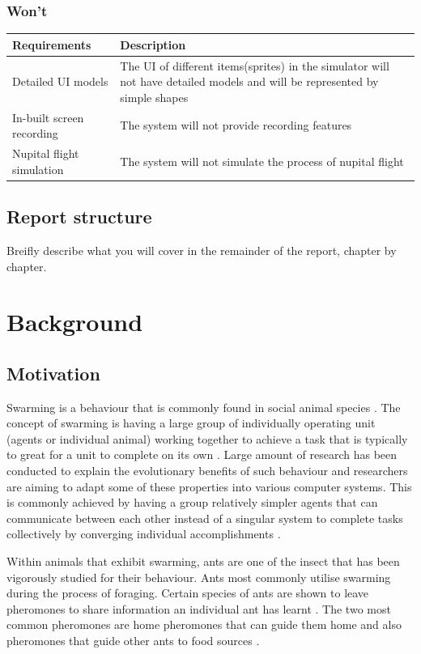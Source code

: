 \documentclass[a4paper, oneside, 11pt]{report}
\begin{document}
\subsection{Won't}
\begin{tabular}{|| p{3.5cm} | p{10.5cm} ||} 
	\hline
	Requirements & Description \\
	\hline
	Detailed UI models &  The UI of different items(sprites) in the simulator will not have detailed models and will be represented by simple shapes\\
	\hline
	In-built screen recording & The system will not provide recording features \\
	\hline
	Nupital flight simulation & The system will not simulate the process of nupital flight \\
	\hline
\end{tabular}

\section{Report structure}
Breifly describe what you will cover in the remainder of the report, chapter by chapter.

\chapter{Background}
\section{Motivation}
Swarming is a behaviour that is commonly found in social animal species \citep{Swarm_Animals}. The concept of swarming is having a large group of individually operating unit (agents or individual animal) working together to achieve a task that is typically to great for a unit to complete on its own \citep{Swarm_Explanation}. Large amount of research has been conducted to explain the evolutionary benefits of such behaviour and researchers are aiming to adapt some of these properties into various computer systems. This is commonly achieved by having a group relatively simpler agents that can communicate between each other instead of a singular system to complete tasks collectively by converging individual accomplishments \citep{Swarm_Properties}.

Within animals that exhibit swarming, ants are one of the insect that has been vigorously studied for their behaviour. Ants most commonly utilise swarming during the process of foraging. Certain species of ants are shown to leave pheromones to share information an individual ant has learnt \citep{Ant_Pheromones}. The two most common pheromones are home pheromones that can guide them home and also pheromones that guide other ants to food sources \citep{Ant_Pheromones}. 
\end{document}
